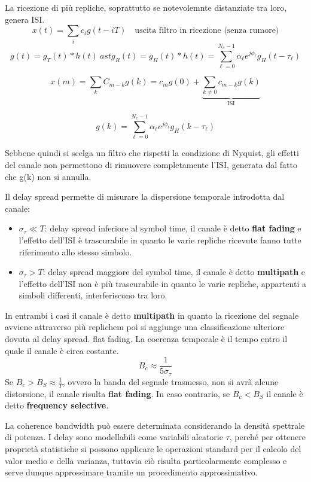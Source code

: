 La ricezione di più repliche, soprattutto se notevolemnte distanziate tra loro, genera ISI.
\[
    x(t) = \sum_{i} c_i g(t - iT) \quad \text{uscita filtro in ricezione (senza rumore)}
\]
\[
    g(t) = g_T(t) \ast h(t) \ ast g_R(t) = g_H(t) \ast h(t) = \sum_{\ell=0}^{N_c-1} \alpha_{\ell} e^{j\phi_{\ell}} g_H(t - \tau_{\ell})
\]

\[
  x(m) = \sum_{k}  C_{m-k}g(k) = c_m g(0) + \underbrace{\sum_{k \neq 0} c_{m-k} g(k)}_{\text{ISI}}
\]

\[
    g(k) = \sum_{\ell=0}^{N_c-1} \alpha_{\ell} e^{j\phi_{\ell}} g_H(k - \tau_{\ell})
\]

Sebbene quindi si scelga un filtro che rispetti la condizione di Nyquist, gli effetti del canale non permettono di rimuovere completamente l'ISI, generata dal fatto che g(k) non si annulla.


Il delay spread permette di misurare la dispersione temporale introdotta dal canale:
\begin{itemize}
    \item $\sigma_\tau \ll T$: delay spread inferiore al symbol time, il canale è detto \textbf{flat fading}  e l'effetto dell'ISI è trascurabile in quanto le varie repliche ricevute fanno tutte riferimento allo stesso simbolo.
    \item $\sigma_\tau > T$: delay spread maggiore del symbol time, il canale è detto \textbf{multipath} e l'effetto dell'ISI non è più trascurabile in quanto le varie repliche, appartenti a simboli differenti, interferiscono tra loro.
\end{itemize}

In entrambi i casi il canale è detto \textbf{multipath} in quanto la ricezione del segnale avviene attraverso più replichem poi si aggiunge una classificazione ulteriore dovuta al delay spread.
flat fading. La coerenza temporale è il tempo entro il quale il canale è circa costante.
\[
    B_c \approx \frac{1}{5\sigma_\tau}
\]
Se $B_c > B_S \approx \frac{1}{T}$, ovvero la banda del segnale trasmesso, non si avrà alcune distorsione, il canale risulta \textbf{flat fading}. In caso contrario, se $B_c < B_S$ il canale è detto \textbf{frequency selective}. 

La coherence bandwidth può essere determinata considerando la densità spettrale di potenza.
I delay sono modellabili come variabili aleatorie $\tau$, perché per ottenere proprietà statistiche si possono applicare le operazioni standard per il calcolo del valor medio e della varianza, tuttavia ciò risulta particolarmente complesso e serve dunque approssimare tramite un procedimento approssimativo.


